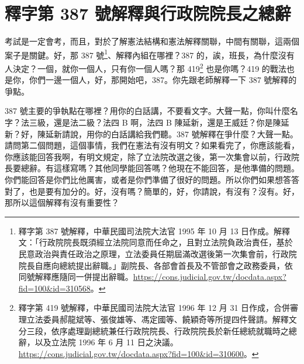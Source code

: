 \section{釋字第 387 號解釋與行政院院長之總辭}

\hypertarget{c08:cue:9}{}考試是一定會考，而且，對於了解憲法結構和憲法解釋關聯，中間有關聯，這兩個案子是關鍵。好，那 387 號\footnote{釋字第 387 號解釋，中華民國司法院大法官 1995 年 10 月 13 日作成。解釋文：「行政院院長既須經立法院同意而任命之，且對立法院負政治責任，基於民意政治與責任政治之原理，立法委員任期屆滿改選後第一次集會前，行政院院長自應向總統提出辭職。」副院長、各部會首長及不管部會之政務委員，依同號解釋應隨同一併提出辭職。\url{https://cons.judicial.gov.tw/docdata.aspx?fid=100&id=310568}。}、解釋內組在哪裡？387 的，誒，班長，為什麼沒有人決定？一個，就你一個人，只有你一個人嗎？那 419\footnote{釋字第 419 號解釋，中華民國司法院大法官 1996 年 12 月 31 日作成，合併審理立法委員郝龍斌等、張俊雄等、馮定國等、饒穎奇等所提四件聲請。解釋文分三段，依序處理副總統兼任行政院院長、行政院院長於新任總統就職時之總辭，以及立法院 1996 年 6 月 11 日之決議。\url{https://cons.judicial.gov.tw/docdata.aspx?fid=100&id=310600}。} 也是你嗎？419 的戰法也是你，你們一邊一個人，好，那開始吧，387。你先跟老師解釋一下 387 號解釋的爭點。

\hypertarget{c08:cue:10}{}387 號主要的爭執點在哪裡？用你的白話講，不要看文字。大聲一點，你叫什麼名字？法三級，還是法二級？法四 B 啊，法四 B 陳延新，還是王威廷？你是陳延新？好，陳延新請說，用你的白話講給我們聽。387 號解釋在爭什麼？大聲一點。請問第二個問題，這個事情，我們在憲法有沒有明文？如果看完了，你應該能看，
\hypertarget{c08:cue:11}{}你應該能回答我啊，有明文規定，除了立法院改選之後，第一次集會以前，行政院長要總辭。有這樣寫嗎？其他同學能回答嗎？他現在不能回答，是他準備的問題。你們能回答是你們比他厲害，或者是你們準備了很好的問題。所以你們如果想答答對了，也是要有加分的。好，沒有嗎？簡單的，好，你請說，有沒有？沒有。好，那所以這個解釋有沒有重要性？

